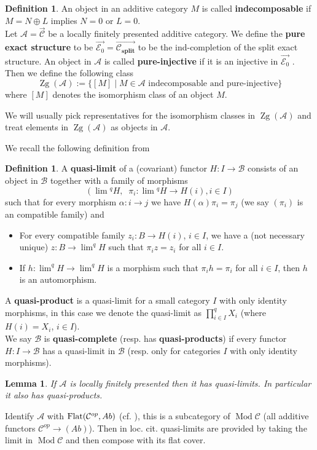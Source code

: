 \documentclass[11pt,a4paper]{amsart}
\theoremstyle{plain}
\newtheorem{lem}[thm]{Lemma}
\theoremstyle{definition}
\newtheorem{dfn}[thm]{Definition}
\DeclareMathOperator{\Modu}{Mod}
\newcommand{\mcA}{\mathcal{A}}
\newcommand{\mcB}{\mathcal{B}}
\newcommand{\mcC}{\mathcal{C}}
\newcommand{\mcE}{\mathcal{E}}
\DeclareMathOperator{\Zg}{Zg}
\begin{document}
\begin{dfn}
An object in an additive category $M$ is called \textbf{indecomposable} if $M=N\oplus L$ implies $N=0$ or $L=0$.\\
Let $\mcA=\overrightarrow{\mcC}$ be a locally finitely presented additive category. We define the \textbf{pure exact structure} to be $\overrightarrow{\mcE_0}=\overrightarrow{\mcC_{\textbf{split}}}$ to be the ind-completion of the split exact structure. An object in $\mcA$ is called \textbf{pure-injective} if it is an injective in $\overrightarrow{\mcE_0}$ . 
Then we define the following class 
\[
\Zg (\mcA):= \{ [M]\mid M \in \mcA \text{ indecomposable and pure-injective}\}
\]
where $[M]$ denotes the isomorphism class of an object $M$. 
\end{dfn}
We will usually pick representatives for the isomorphism classes in $\Zg(\mcA)$ and treat elements in $\Zg (\mcA)$ as objects in $\mcA$. 

We recall the following definition from \cite{BeG}
\begin{dfn}
A \textbf{quasi-limit} of a (covariant) functor $H\colon I \to  \mcB$ consists of an object in $\mcB$ together with a family of morphisms \[(\lim{}^q H , \;\;\pi_i \colon \lim{}^q H \to H(i), i \in I)\] such that for every morphism $\alpha\colon  i \to j$ we have $H(\alpha )\pi_i=\pi_j$ (we say $(\pi_i)$ is an compatible family) and \\
\begin{itemize}
\item[(1)] For every compatible family $z_i \colon B \to H(i)$, $i\in I$, we have a (not necessary unique) $z\colon B \to \lim^q H$ such that $\pi_i z=z_i$ for all $i \in I$.
\item[(2)] If $h \colon \lim^qH \to \lim^qH$ is a morphism such that $\pi_i h =\pi_i$ for all $i \in I$, then $h$ is an automorphism. 
\end{itemize}
A \textbf{quasi-product} is a quasi-limit for a small  category $I$ with only identity morphisms, in this case we denote the quasi-limit as $\prod^q_{i\in I}X_i$ (where $H(i)=X_i$, $i \in I$). \\ 
We say $\mcB$ is \textbf{quasi-complete} (resp. has \textbf{quasi-products}) if every functor $H \colon I \to \mcB$ has a quasi-limit in $\mcB$ (resp. only for categories $I$ with only identity morphisms). 
\end{dfn}

\begin{lem}\cite[Thm 2]{BeG}
If $\mcA$ is locally finitely presented then it has  quasi-limits. In particular it also has quasi-products. \end{lem}
Identify $\mcA$ with ${\rm Flat}(\mcC^{op}, Ab)$ (cf. \cite[Thm 3]{CB}), this is a subcategory of $\Modu \mcC$ (all additive functors $\mcC^{op} \to (Ab)$). Then in loc. cit. quasi-limits are provided by taking the limit in $\Modu \mcC$ and then compose with its flat cover.  
\end{document}
